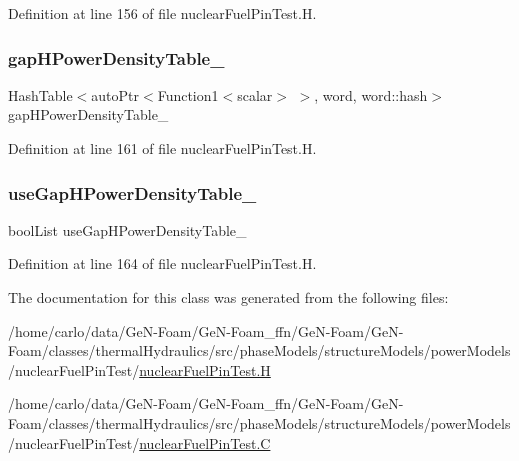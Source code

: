 Definition at line 156 of file nuclear\+Fuel\+Pin\+Test.\+H.

\mbox{\label{classFoam_1_1powerModels_1_1nuclearFuelPinTest_af3e43259f1e5ea73a5bb89f36d6cf584}} 
\subsubsection{\texorpdfstring{gap\+H\+Power\+Density\+Table\+\_\+}{gapHPowerDensityTable\_}}
{\footnotesize\ttfamily Hash\+Table$<$auto\+Ptr$<$Function1$<$scalar$>$ $>$, word, word\+::hash$>$ gap\+H\+Power\+Density\+Table\+\_\+\hspace{0.3cm}{\ttfamily [protected]}}



Definition at line 161 of file nuclear\+Fuel\+Pin\+Test.\+H.

\mbox{\label{classFoam_1_1powerModels_1_1nuclearFuelPinTest_a09a38dead56d361b78f3134ba95438a0}} 
\subsubsection{\texorpdfstring{use\+Gap\+H\+Power\+Density\+Table\+\_\+}{useGapHPowerDensityTable\_}}
{\footnotesize\ttfamily bool\+List use\+Gap\+H\+Power\+Density\+Table\+\_\+\hspace{0.3cm}{\ttfamily [protected]}}



Definition at line 164 of file nuclear\+Fuel\+Pin\+Test.\+H.



The documentation for this class was generated from the following files\+:\begin{DoxyCompactItemize}
\item 
/home/carlo/data/\+Ge\+N-\/\+Foam/\+Ge\+N-\/\+Foam\+\_\+ffn/\+Ge\+N-\/\+Foam/\+Ge\+N-\/\+Foam/classes/thermal\+Hydraulics/src/phase\+Models/structure\+Models/power\+Models/nuclear\+Fuel\+Pin\+Test/\hyperlink{nuclearFuelPinTest_8H}{nuclear\+Fuel\+Pin\+Test.\+H}\item 
/home/carlo/data/\+Ge\+N-\/\+Foam/\+Ge\+N-\/\+Foam\+\_\+ffn/\+Ge\+N-\/\+Foam/\+Ge\+N-\/\+Foam/classes/thermal\+Hydraulics/src/phase\+Models/structure\+Models/power\+Models/nuclear\+Fuel\+Pin\+Test/\hyperlink{nuclearFuelPinTest_8C}{nuclear\+Fuel\+Pin\+Test.\+C}\end{DoxyCompactItemize}
